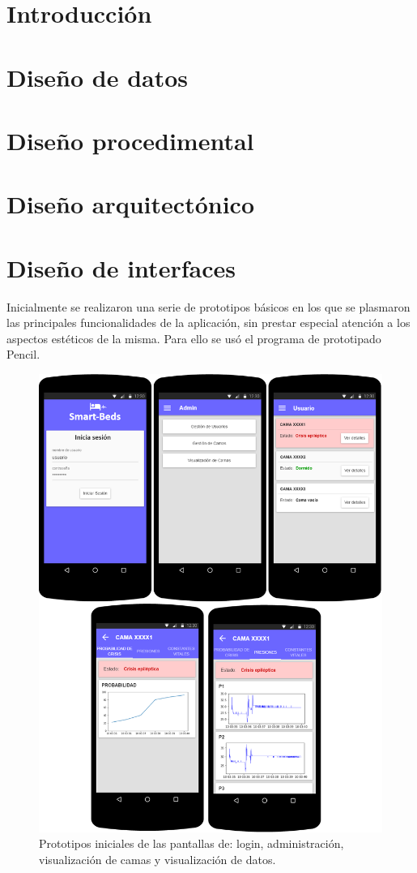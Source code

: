 
\section{Introducción}

\section{Diseño de datos}

\section{Diseño procedimental}

\section{Diseño arquitectónico}

\section{Diseño de interfaces}

Inicialmente se realizaron una serie de prototipos básicos en los que se plasmaron las principales funcionalidades de la aplicación, sin prestar especial atención a los aspectos estéticos de la misma. Para ello se usó el programa de prototipado Pencil. 

\begin{figure}
	\centering
	\includegraphics[width=1\textwidth]{../img/prototipos.png}
	\caption{Prototipos iniciales de las pantallas de: login, administración, visualización de camas y visualización de datos.}
	\label{fig:prototipos}
\end{figure}
